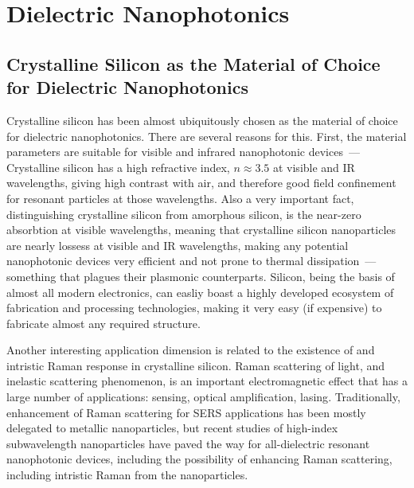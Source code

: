 \section{Dielectric Nanophotonics}
\label{ch:DielectricNanophotoics}

    \subsection{Crystalline Silicon as the Material of Choice for Dielectric Nanophotonics}
            Crystalline silicon has been almost ubiquitously chosen as the material of choice for dielectric nanophotonics.
        There are several reasons for this. First, the material parameters are suitable for visible and infrared nanophotonic devices~---
        Crystalline silicon has a high refractive index, $n \approx 3.5$ at visible and IR wavelengths\cite{li1980refractive}, giving high contrast
        with air, and therefore good field confinement for resonant particles at those wavelengths\cite{mie1908beitrage, dmitriev2016resonant}. Also
        a very important fact, distinguishing crystalline silicon from amorphous silicon, is the near-zero absorbtion at visible wavelengths, meaning
        that crystalline silicon nanoparticles are nearly lossess at visible and IR wavelengths, making any potential nanophotonic devices very
        efficient and not prone to thermal dissipation~--- something that plagues their plasmonic counterparts.
            Silicon, being the basis of almost all modern electronics, can easliy boast a highly developed ecosystem of fabrication and processing
        technologies, making it very easy (if expensive) to fabricate almost any required structure.

            Another interesting application dimension is related to the existence of and intristic Raman response in crystalline silicon. Raman
        scattering of light, and inelastic scattering phenomenon, is an important electromagnetic effect\cite{hayes2012scattering} that has a large number of applications:
        sensing\cite{moskovits1985surface}, optical amplification\cite{islam2004wideband}, lasing\cite{pask2003design}.
        Traditionally, enhancement of Raman scattering for SERS applications has been mostly delegated to metallic nanoparticles, but
        recent studies of high-index subwavelength nanoparticles have paved the way for all-dielectric resonant nanophotonic devices, including
        the possibility of enhancing Raman scattering, including intristic Raman from the nanoparticles.

